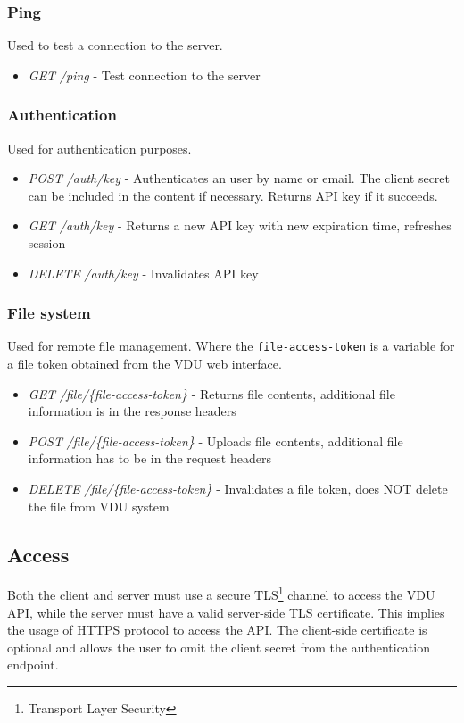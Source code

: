 \subsubsection{Ping}
Used to test a connection to the server.
\begin{itemize}
 \item \textit{GET} \textit{/ping} - Test connection to the server
\end{itemize}
\subsubsection{Authentication}
Used for authentication purposes.
\begin{itemize}
 \item \textit{POST} \textit{/auth/key} - Authenticates an user by name or email. The client secret can be included in the content if necessary. Returns API key if it succeeds.
 \item \textit{GET} \textit{/auth/key} - Returns a new API key with new expiration time, refreshes session
 \item \textit{DELETE} \textit{/auth/key} - Invalidates API key
\end{itemize}
\subsubsection{File system}
Used for remote file management. Where the \lstinline{file-access-token} is a variable for a file token obtained from the VDU web interface.
\begin{itemize}
 \item \textit{GET} \textit{/file/\{file-access-token\}} - Returns file contents, additional file information is in the response headers
 \item \textit{POST} \textit{/file/\{file-access-token\}} - Uploads file contents, additional file information has to be in the request headers
 \item \textit{DELETE} \textit{/file/\{file-access-token\}} - Invalidates a file token, does NOT delete the file from VDU system
\end{itemize}

\subsection{Access}
Both the client and server must use a secure TLS\footnote{Transport Layer Security} channel to access the VDU API, while the server must have a valid server-side TLS certificate. This implies the usage of HTTPS protocol to access the API. The client-side certificate is optional and allows the user to omit the client secret from the authentication endpoint.

